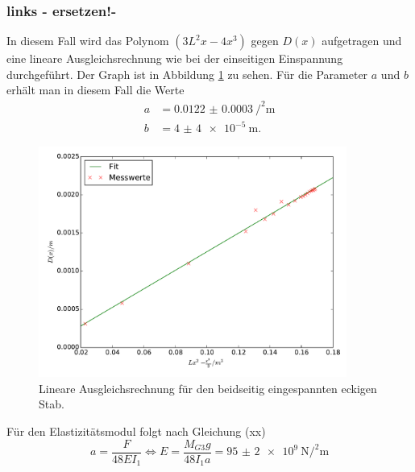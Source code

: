 \subsubsection{links - ersetzen!-}
In diesem Fall wird das Polynom $\left(3 L^2 x - 4 x^3\right)$ gegen $D(x)$
aufgetragen und eine lineare Ausgleichsrechnung wie bei der einseitigen Einspannung
durchgeführt. Der Graph ist in Abbildung \ref{fig:plot_beidseitig1} zu sehen.
Für die Parameter $a$ und $b$ erhält man in diesem Fall die Werte
\begin{align*}
  a &= \SI{0.0122(3)}{\per\squared\meter}\\
  b &= \SI{4(4)e-5}{\meter}.
\end{align*}
\begin{figure}
  \centering
  \includegraphics[width=0.9\textwidth]{stab1_beidseitig_links.pdf}
  \caption{Lineare Ausgleichsrechnung für den beidseitig eingespannten eckigen Stab.}
  \label{fig:plot_beidseitig1}
\end{figure}
Für den Elastizitätsmodul folgt nach Gleichung (xx)
\begin{equation}
  a = \frac{F}{48 E I_1} \iff E = \frac{M_{G3} g}{48 I_1 a}
  = \SI{95(2)e+9}{\newton\per\squared\meter}
  \label{eqn:Emodul3}
\end{equation}

